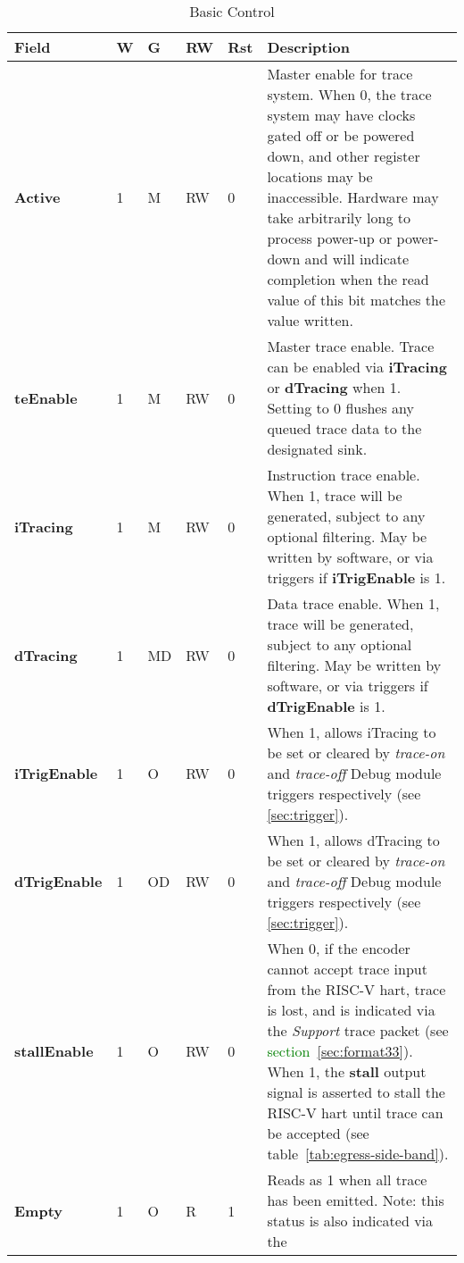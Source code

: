 \begin{table}[htp]
  \centering
  \caption{Basic Control}
  \label{tab:ctl-basic}
  \begin{tabulary}{\textwidth}{|l|l|l|l|l|p{90mm}|}
    \hline
    {\bf Field} & {\bf W} & {\bf G} & {\bf RW} & {\bf Rst} & {\bf Description} \\
    \hline
    \textbf{Active} & 1 & M & RW & 0 & Master enable for trace system.  When 0, the trace system may have clocks gated off or be powered down,
     and other register locations may be inaccessible.
      Hardware may take arbitrarily long to process power-up or power-down and will indicate completion when the read value of this bit
      matches the value written.\\
    \hline
    \textbf{teEnable} & 1 & M & RW & 0 & 
      Master trace enable.  Trace can be enabled via \textbf{iTracing}
      or \textbf{dTracing} when 1. Setting to 0 flushes any queued trace data to the designated sink.\\
    \hline
    \textbf{iTracing} & 1 & M & RW & 0 & Instruction trace enable.  When 1, trace will be generated,
       subject to any optional filtering.  May be written by software, or via triggers if \textbf{iTrigEnable} is 1.  \\
    \hline
    \textbf{dTracing} & 1 & MD & RW & 0 & Data trace enable.  When 1, trace will be generated,
       subject to any optional filtering.  May be written by software, or via triggers if \textbf{dTrigEnable} is 1.  \\
    \hline
    \textbf{iTrigEnable} & 1 & O & RW & 0 & When 1, allows iTracing to be set or cleared by \textit{trace-on} and \textit{trace-off} 
      Debug module triggers respectively (see \ref{sec:trigger}).\\
    \hline
    \textbf{dTrigEnable} & 1 & OD & RW & 0 & When 1, allows dTracing to be set or cleared by \textit{trace-on} and \textit{trace-off} 
      Debug module triggers respectively (see \ref{sec:trigger}).\\
    \hline
    \textbf{stallEnable} & 1 & O & RW & 0 & When 0, if the encoder cannot accept trace input from the RISC-V hart, trace is lost, and is
      indicated via the \textit{Support} trace packet (see \textcolor{green}{section}~\ref{sec:format33}).\newline
      When 1, the \textbf{stall} output signal is asserted to stall the RISC-V hart until trace can be accepted (see table~\ref{tab:egress-side-band}).\\
    \hline
    \textbf{Empty} & 1 & O & R & 1 & Reads as 1 when all trace has been emitted.  Note: this status is also indicated via the 

\end{tabulary}
\end{table}
